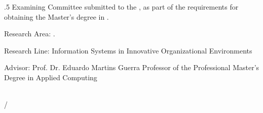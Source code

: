 \begingroup

\centering

\large
\authorname

\vspace{1.5 cm}

\doctitle

\normalsize

\vspace{1.5 cm}

\begin{flushright}
\begin{adjustwidth}{.5\textwidth}{}
Examining Committee submitted to the \universityfull, as part of the requirements for obtaining the Master's degree in \knowledgearea.

Research Area: \knowledgearea.

Research Line: Information Systems in Innovative Organizational Environments

\hfill \newline
Advisor: Prof. Dr. Eduardo Martins Guerra\newline
Professor of the Professional Master's Degree in Applied Computing\\
\end{adjustwidth}
\end{flushright}

\vfill

\begin{center}
\large
\state\\
\thesismonth\slash\thesisyear
\end{center}

\endgroup